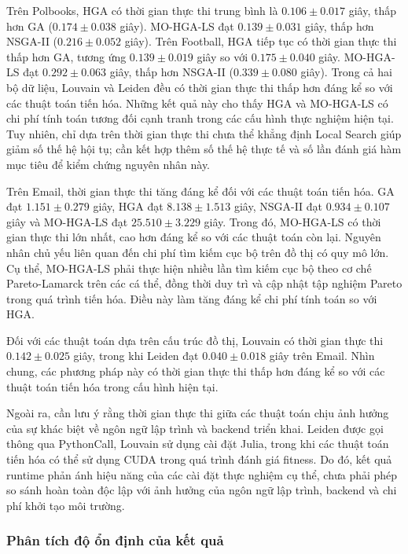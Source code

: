 \documentclass[14pt,a4paper]{extarticle}
\begin{document}
Trên Polbooks, HGA có thời gian thực thi trung bình là $0.106 \pm 0.017$ giây, thấp hơn GA ($0.174 \pm 0.038$ giây). MO-HGA-LS đạt $0.139 \pm 0.031$ giây, thấp hơn NSGA-II ($0.216 \pm 0.052$ giây). Trên Football, HGA tiếp tục có thời gian thực thi thấp hơn GA, tương ứng $0.139 \pm 0.019$ giây so với $0.175 \pm 0.040$ giây. MO-HGA-LS đạt $0.292 \pm 0.063$ giây, thấp hơn NSGA-II ($0.339 \pm 0.080$ giây). Trong cả hai bộ dữ liệu, Louvain và Leiden đều có thời gian thực thi thấp hơn đáng kể so với các thuật toán tiến hóa. Những kết quả này cho thấy HGA và MO-HGA-LS có chi phí tính toán tương đối cạnh tranh trong các cấu hình thực nghiệm hiện tại. Tuy nhiên, chỉ dựa trên thời gian thực thi chưa thể khẳng định Local Search giúp giảm số thế hệ hội tụ; cần kết hợp thêm số thế hệ thực tế và số lần đánh giá hàm mục tiêu để kiểm chứng nguyên nhân này.

Trên Email, thời gian thực thi tăng đáng kể đối với các thuật toán tiến hóa. GA đạt $1.151 \pm 0.279$ giây, HGA đạt $8.138 \pm 1.513$ giây, NSGA-II đạt $0.934 \pm 0.107$ giây và MO-HGA-LS đạt $25.510 \pm 3.229$ giây. Trong đó, MO-HGA-LS có thời gian thực thi lớn nhất, cao hơn đáng kể so với các thuật toán còn lại. Nguyên nhân chủ yếu liên quan đến chi phí tìm kiếm cục bộ trên đồ thị có quy mô lớn. Cụ thể, MO-HGA-LS phải thực hiện nhiều lần tìm kiếm cục bộ theo cơ chế Pareto-Lamarck trên các cá thể, đồng thời duy trì và cập nhật tập nghiệm Pareto trong quá trình tiến hóa. Điều này làm tăng đáng kể chi phí tính toán so với HGA.

Đối với các thuật toán dựa trên cấu trúc đồ thị, Louvain có thời gian thực thi $0.142 \pm 0.025$ giây, trong khi Leiden đạt $0.040 \pm 0.018$ giây trên Email. Nhìn chung, các phương pháp này có thời gian thực thi thấp hơn đáng kể so với các thuật toán tiến hóa trong cấu hình hiện tại.

Ngoài ra, cần lưu ý rằng thời gian thực thi giữa các thuật toán chịu ảnh hưởng của sự khác biệt về ngôn ngữ lập trình và backend triển khai. Leiden được gọi thông qua PythonCall, Louvain sử dụng cài đặt Julia, trong khi các thuật toán tiến hóa có thể sử dụng CUDA trong quá trình đánh giá fitness. Do đó, kết quả runtime phản ánh hiệu năng của các cài đặt thực nghiệm cụ thể, chưa phải phép so sánh hoàn toàn độc lập với ảnh hưởng của ngôn ngữ lập trình, backend và chi phí khởi tạo môi trường.

\subsubsection{Phân tích độ ổn định của kết quả}
\end{document}
